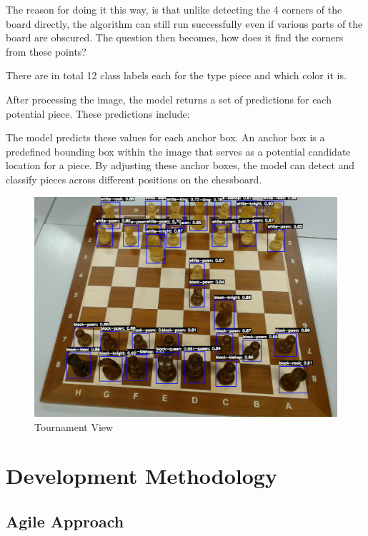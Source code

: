 The reason for doing it this way, is that unlike detecting the 4 corners of the board directly, the algorithm can still run successfully even if various parts of the board are obscured. The question then becomes, how does it find the corners from these points?


There are in total 12 class labels each for the type piece and which color it is.

After processing the image, the model returns a set of predictions for each potential piece. These predictions include:

The model predicts these values for each anchor box. An anchor box is a predefined bounding box within the image that serves as a potential candidate location for a piece. By adjusting these anchor boxes, the model can detect and classify pieces across different positions on the chessboard.


\begin{subfigure}[h!]{0.9\linewidth} \centering \includegraphics[width=\linewidth]{figures/methods/ml-models/piece-model.png} \caption{Tournament View} \end{subfigure}



\section{Development Methodology}
\label{sec:development-methodology}

\subsection{Agile Approach}
\label{subsec:agile-approach}

